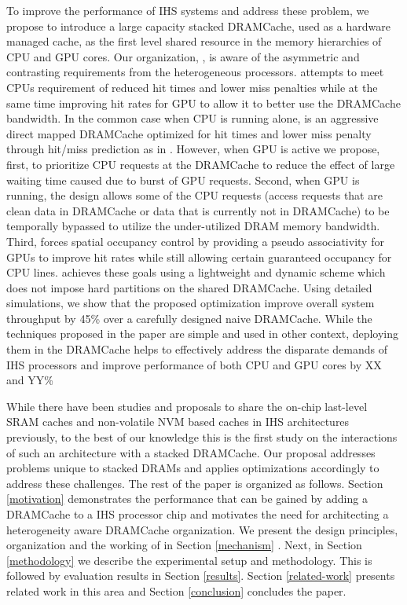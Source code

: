To improve the performance of IHS systems and address these problem, we propose to introduce a large capacity stacked DRAMCache, used as a hardware managed cache, as the first level shared resource in the memory hierarchies of CPU and GPU cores. Our organization, \cachename, is aware of the asymmetric and contrasting requirements from the heterogeneous processors. \cachename attempts to meet CPUs requirement of reduced hit times and lower miss penalties while at the same time improving hit rates for GPU to allow it to better use the DRAMCache bandwidth. In the common case when CPU is running alone, \textit{\cachename} is an aggressive direct mapped DRAMCache optimized for hit times and lower miss penalty through hit/miss prediction as in \cite{alloy}. However, when GPU is active we propose,  first, to prioritize CPU requests at the DRAMCache to reduce the effect of large waiting time caused due to burst of GPU requests. Second, when GPU is running, the \cachename design allows some of the CPU requests (access requests that are clean data in DRAMCache or data that is currently not in DRAMCache) to be temporally bypassed to utilize the under-utilized DRAM memory bandwidth. 
Third, \cachename forces spatial occupancy control by providing a pseudo associativity for GPUs to improve hit rates while still allowing certain guaranteed occupancy for CPU lines. \cachename achieves these goals using a lightweight and dynamic scheme which does not impose hard partitions on the shared DRAMCache. Using detailed simulations, we show that the proposed optimization improve overall system throughput by 45\% over a carefully designed naive DRAMCache.
While the techniques proposed in the paper are simple and used in other context, deploying them in the DRAMCache helps to effectively address the disparate demands of IHS processors and improve performance of both CPU and GPU cores by XX and YY\%

\par While there have been studies and proposals to share the on-chip last-level SRAM caches \cite{helm} and non-volatile NVM based caches \cite{oscar} in IHS architectures previously, to the best of our knowledge this is the first study on the interactions of such an architecture with a stacked DRAMCache. %
Our proposal \cachename addresses problems unique to stacked DRAMs and applies optimizations accordingly to address these challenges. The rest of the paper is organized as follows. Section \ref{motivation} demonstrates the performance that can be gained by adding a DRAMCache to a IHS processor chip and motivates the need for architecting a heterogeneity aware DRAMCache organization. We present the design principles, organization and the working of \cachename in Section \ref{mechanism} . Next, in Section \ref{methodology} we describe the experimental setup and methodology. This is followed by evaluation results in Section \ref{results}. Section \ref{related-work} presents related work in this area and Section \ref{conclusion} concludes the paper.
